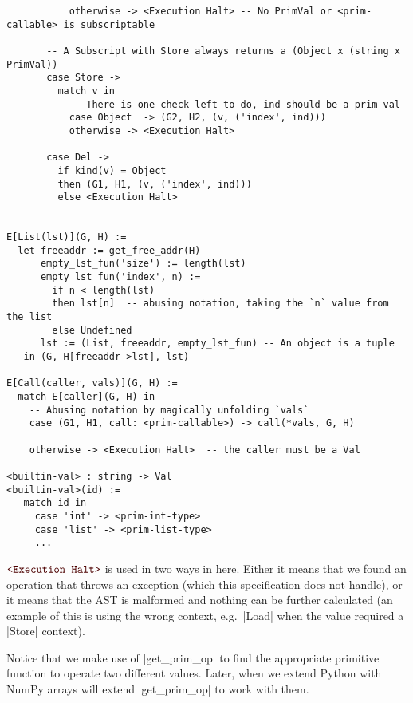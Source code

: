 \begin{verbatim}
           otherwise -> <Execution Halt> -- No PrimVal or <prim-callable> is subscriptable

       -- A Subscript with Store always returns a (Object x (string x PrimVal))
       case Store ->
         match v in
           -- There is one check left to do, ind should be a prim val
           case Object  -> (G2, H2, (v, ('index', ind)))
           otherwise -> <Execution Halt>

       case Del ->
         if kind(v) = Object
         then (G1, H1, (v, ('index', ind)))
         else <Execution Halt>


E[List(lst)](G, H) :=
  let freeaddr := get_free_addr(H)
      empty_lst_fun('size') := length(lst)
      empty_lst_fun('index', n) :=
        if n < length(lst)
        then lst[n]  -- abusing notation, taking the `n` value from the list
        else Undefined
      lst := (List, freeaddr, empty_lst_fun) -- An object is a tuple
   in (G, H[freeaddr->lst], lst)

E[Call(caller, vals)](G, H) :=
  match E[caller](G, H) in
    -- Abusing notation by magically unfolding `vals`
    case (G1, H1, call: <prim-callable>) -> call(*vals, G, H)

    otherwise -> <Execution Halt>  -- the caller must be a Val

<builtin-val> : string -> Val
<builtin-val>(id) :=
   match id in
     case 'int' -> <prim-int-type>
     case 'list' -> <prim-list-type>
     ...
\end{verbatim}

$\Halt$ is used in two ways in
here. Either it means that we found an operation that throws an
exception (which this specification does not handle), or it means that
the AST is malformed and nothing can be further calculated (an example
of this is using the wrong context, e.g.~\pycode|Load| when the value
required a \pycode|Store| context).


Notice that we make use of \pycode|get_prim_op| to find the appropriate
primitive function to operate two different values. Later, when we
extend Python with NumPy arrays will extend \pycode|get_prim_op| to
work with them.

